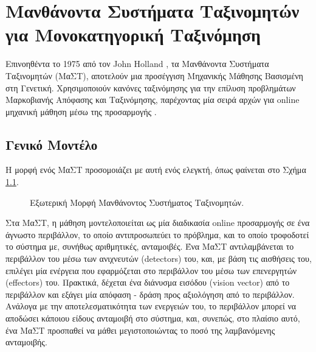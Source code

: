 \chapter{Μανθάνοντα Συστήματα Ταξινομητών για Μονοκατηγορική Ταξινόμηση}
\label{learningClassifierSystems}
Επινοηθέντα το 1975 από τον John Holland \cite{holland}, τα Μανθάνοντα Συστήματα Ταξινομητών (ΜαΣΤ), αποτελούν μια προσέγγιση Μηχανικής Μάθησης Βασισμένη στη Γενετική. Χρησιμοποιούν κανόνες ταξινόμησης για την επίλυση προβλημάτων Μαρκοβιανής Απόφασης και Ταξινόμησης, παρέχοντας μία σειρά αρχών για online μηχανική μάθηση μέσω της προσαρμογής \cite{holland78}.

\section{Γενικό Μοντέλο}
\label{sec:lcsGenericModel}
Η μορφή ενός ΜαΣΤ προσομοιάζει με αυτή ενός ελεγκτή, όπως φαίνεται στο Σχήμα \ref{fig:LCScontroller}.

\begin{figure}[htb]
 \begin{center}
  
  \caption{Εξωτερική Μορφή Μανθάνοντος Συστήματος Ταξινομητών.}
  \label{fig:LCScontroller}
 \end{center}
\end{figure}

Στα ΜαΣΤ, η μάθηση μοντελοποιείται ως μία διαδικασία online προσαρμογής σε ένα άγνωστο περιβάλλον, το οποίο αντιπροσωπεύει το πρόβλημα, και το οποίο τροφοδοτεί το σύστημα με, συνήθως αριθμητικές, ανταμοιβές. Ένα ΜαΣΤ αντιλαμβάνεται το περιβάλλον του μέσω των ανιχνευτών (detectors) του, και, με βάση τις αισθήσεις του, επιλέγει μία ενέργεια που εφαρμόζεται στο περιβάλλον του μέσω των επενεργητών (effectors) του. Πρακτικά, δέχεται ένα διάνυσμα εισόδου (vision vector) από το περιβάλλον και εξάγει μία απόφαση - δράση προς αξιολόγηση από το περιβάλλον. Ανάλογα με την αποτελεσματικότητα των ενεργειών του, το περιβάλλον μπορεί να αποδώσει κάποιου είδους ανταμοιβή στο σύστημα, και, συνεπώς, στο πλαίσιο αυτό, ένα ΜαΣΤ προσπαθεί να μάθει μεγιστοποιώντας το ποσό της λαμβανόμενης ανταμοιβής.

